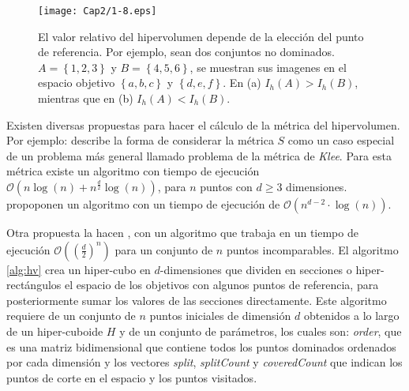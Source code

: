     \begin{figure}
	\centering
	\texttt{[image: Cap2/1-8.eps]}
	  \caption [Elecci\'on del Punto de Referencia]{
	  El valor relativo del hipervolumen depende de la elecci\'on del punto de  referencia. Por ejemplo,
	  sean dos conjuntos no dominados. $A = \left\{1, 2, 3\right\}$ y $B = \left\{4, 5, 6\right\}$, 
	  se muestran sus imagenes en el espacio objetivo $\left\{a, b, c\right\}$ y $\left\{d, e, f\right\}$.
	  En (a) $I_h\left(A\right) > I_h \left(B\right)$, mientras que en (b) $I_h\left(A\right) < I_h\left( B\right)$.}
      \label{fig:hipevolref}
      \end{figure}

  Existen diversas propuestas para hacer el c\'alculo de la m\'etrica del hipervolumen. Por ejemplo: \cite{Beume2009} 
  describe la forma de considerar la m\'etrica $S$ como un caso especial de un problema m\'as general llamado 
  problema de la m\'etrica de \textit{Klee}. Para esta m\'etrica  existe un algoritmo con tiempo de ejecuci\'on 
  $\mathcal{O}(n\log(n) + n^{\frac{d}{2}}\log (n))$, para $n$ puntos con $d\geq 3$ dimensiones. \cite{FonPaqhypervolume} 
  propoponen un algoritmo con un tiempo de ejecuci\'on de $\mathcal{O}(n^{d-2}\cdot\log (n))$. 

  Otra propuesta la hacen \cite{YangNovel}, con un algoritmo que trabaja en un tiempo de ejecuci\'on $\mathcal{O}((\frac{d}{2})^n)$ para un conjunto de $n$ puntos incomparables. El algoritmo \ref{alg:hv}
  crea un hiper-cubo en $d$-dimensiones que dividen en secciones o hiper-rect\'angulos el espacio de los objetivos con algunos 
  puntos de referencia, para posteriormente sumar los valores de las secciones directamente. Este algoritmo requiere de un conjunto 
  de $n$ puntos iniciales de dimensi\'on $d$ obtenidos a lo largo de un hiper-cuboide $H$ y de un conjunto de par\'ametros, 
  los cuales son: \textit{order}, que es una matriz bidimensional que contiene todos los puntos dominados ordenados 
  por cada dimensi\'on y los vectores \textit{split}, \textit{splitCount} y \textit{coveredCount} que indican los puntos 
  de corte en el espacio y los puntos visitados.

